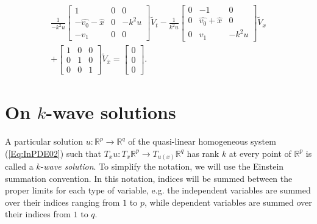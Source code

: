 \documentclass{birkjour}
\theoremstyle{definition}
\theoremstyle{remark}
\numberwithin{equation}{section}
\numberwithin{equation}{section}
\numberwithin{thm}{section}
\numberwithin{equation}{section}
\numberwithin{thm}{section}
\begin{document}
\begin{multline*}
	\frac{1}{-k^2u}\left[\begin{array}{ccc}1&0&0\\-\widehat{v_0}-\widehat{x}&0&-k^2u\\-v_1&0&0\end{array}\right]\widetilde{V}_t-\frac{1}{k^2u}\left[\begin{array}{ccc}0&-1&0\\0&\widehat{v_0}+\widehat{x}&0\\0&v_1&-k^2u\end{array}\right]\widetilde{V}_x\\+\left[\begin{array}{ccc}1&0&0\\0&1&0\\0&0&1\end{array}\right]\widetilde{V}_{\widehat{x}}=\left[\begin{array}{c}0\\0\\0\end{array}\right].
\end{multline*}


\section{On $k$-wave solutions}\label{Se:lw}
A particular solution $u:\mathbb{R}^p\rightarrow \mathbb{R}^q$ of the quasi-linear homogeneous system (\ref{Eq:InPDE02}) such that $T_xu:T_x\mathbb{R}^p\rightarrow T_{u(x)}\mathbb{R}^q$ has rank $k$ at every point of $\mathbb{R}^p$ is called a $k$-{\it wave solution}. To simplify the notation, we will use the Einstein summation convention. In this notation, indices will be summed between the proper limits for each type of variable, e.g. the independent variables are summed over their indices ranging from $1$ to $p$, while dependent variables are summed over their indices from $1$ to $q$. 
\end{document}
